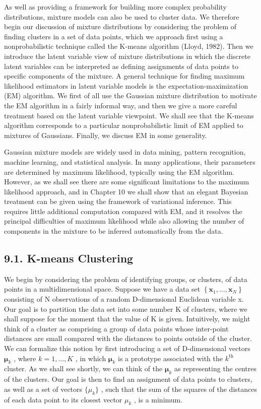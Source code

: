 \documentclass[
  10
]{article}
\begin{document}
As well as providing a framework for building more complex probability
distributions, mixture models can also be used to cluster data. We
therefore begin our discussion of mixture distributions by considering
the problem of finding clusters in a set of data points, which we
approach first using a nonprobabilistic technique called the K-means
algorithm (Lloyd, 1982). Then we introduce the latent variable view of
mixture distributions in which the discrete latent variables can be
interpreted as defining assignments of data points to specific
components of the mixture. A general technique for finding maximum
likelihood estimators in latent variable models is the
expectation-maximization (EM) algorithm. We first of all use the
Gaussian mixture distribution to motivate the EM algorithm in a fairly
informal way, and then we give a more careful treatment based on the
latent variable viewpoint. We shall see that the K-means algorithm
corresponds to a particular nonprobabilistic limit of EM applied to
mixtures of Gaussians. Finally, we discuss EM in some generality.

Gaussian mixture models are widely used in data mining, pattern
recognition, machine learning, and statistical analysis. In many
applications, their parameters are determined by maximum likelihood,
typically using the EM algorithm. However, as we shall see there are
some significant limitations to the maximum likelihood approach, and in
Chapter 10 we shall show that an elegant Bayesian treatment can be given
using the framework of variational inference. This requires little
additional computation compared with EM, and it resolves the principal
difficulties of maximum likelihood while also allowing the number of
components in the mixture to be inferred automatically from the data.

\subsection{9.1. K-means Clustering}\label{k-means-clustering}

We begin by considering the problem of identifying groups, or clusters,
of data points in a multidimensional space. Suppose we have a data set
\(\left\{ \mathbf { x } _ { 1 } , \ldots , \mathbf { x } _ { N } \right\}\)
consisting of N observations of a random D-dimensional Euclidean
variable x. Our goal is to partition the data set into some number K of
clusters, where we shall suppose for the moment that the value of K is
given. Intuitively, we might think of a cluster as comprising a group of
data points whose inter-point distances are small compared with the
distances to points outside of the cluster. We can formalize this notion
by first introducing a set of D-dimensional vectors
\(\pmb { \mu } _ { k }\) , where \(k = 1 , \ldots , K\) , in which
\(\pmb { \mu } _ { k }\) is a prototype associated with the
\(k ^ { \mathrm { t h } }\) cluster. As we shall see shortly, we can
think of the \(\pmb { \mu } _ { k }\) as representing the centres of the
clusters. Our goal is then to find an assignment of data points to
clusters, as well as a set of vectors \(\{ \mu _ { k } \}\) , such that
the sum of the squares of the distances of each data point to its
closest vector \(\mu _ { k }\) , is a minimum.
\end{document}
